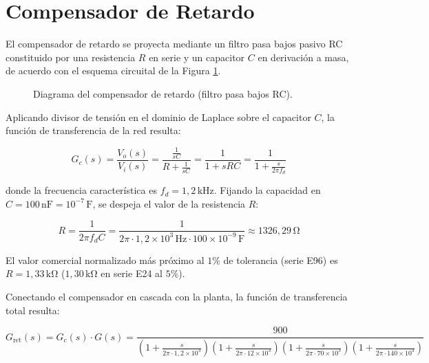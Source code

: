 \clearpage

\section{Compensador de Retardo}

El compensador de retardo se proyecta mediante un filtro pasa bajos pasivo RC constituido por una
resistencia $R$ en serie y un capacitor $C$ en derivación a masa, de acuerdo con el esquema circuital de la Figura
\ref{crkt.ej2:retardo}.

\begin{figure}[!ht]
    \centering
    
    \caption{Diagrama del compensador de retardo (filtro pasa bajos RC).}
    \label{crkt.ej2:retardo}
\end{figure}

Aplicando divisor de tensión en el dominio de Laplace sobre el capacitor $C$, la función de transferencia de la red resulta:

\begin{equation}
    G_c(s) = \frac{V_o(s)}{V_i(s)} = \frac{\frac{1}{sC}}{R + \frac{1}{sC}} = \frac{1}{1 + sRC} = \frac{1}{1 + \frac{s}{2\pi f_d}}
    \label{eq.ej2:fdt_comp_retardo}
\end{equation}

donde la frecuencia característica es $f_d = 1,2\,\si{\kilo\hertz}$. Fijando la capacidad en $C = 100\,\si{\nano\farad} = 10^{-7}\,\si{\farad}$,
se despeja el valor de la resistencia $R$:

\begin{equation}
    R = \frac{1}{2\pi f_d C} = \frac{1}{2\pi \cdot 1,2 \times 10^3\,\si{\hertz} \cdot 100 \times 10^{-9}\,\si{\farad}} \approx 1326,29\,\si{\ohm}
    \label{eq.ej2:calculo_R_retardo}
\end{equation}

El valor comercial normalizado más próximo al $1\%$ de tolerancia (serie E96) es $R = 1,33\,\si{\kilo\ohm}$ ($1,30\,\si{\kilo\ohm}$
en serie E24 al $5\%$).

Conectando el compensador en cascada con la planta, la función de transferencia total resulta:

\begin{equation}
    G_{\text{ret}}(s) = G_c(s) \cdot G(s) = \frac{900}{\left(1 + \frac{s}{2\pi \cdot 1,2 \times 10^3}\right) \left(1 + \frac{s}{2\pi \cdot 12 \times 10^3}\right) \left(1 + \frac{s}{2\pi \cdot 70 \times 10^3}\right) \left(1 + \frac{s}{2\pi \cdot 140 \times 10^3}\right)}
    \label{eq.ej2:fdt_sistema_retardo}
\end{equation}

